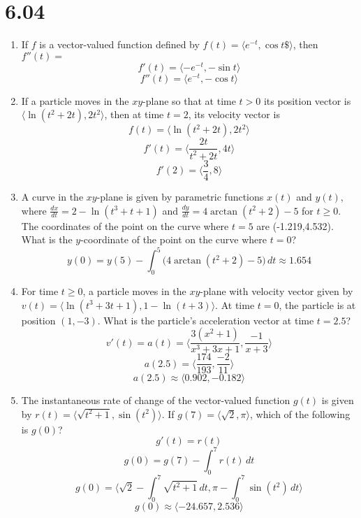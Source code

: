 \documentclass[12pt]{article}
\begin{document}
\section*{6.04}
    \begin{enumerate}
        \item If $f$ is a vector-valued function defined by $f(t)=\langle e^{-t},\cos t\$ \rangle$, then $f''(t)=$
        $$f'(t) = \langle -e^{-t}, -\sin t \rangle $$
        $$\boxed{f''(t) = \langle e^{-t}, -\cos t \rangle}$$

        \item If a particle moves in the $xy$-plane so that at time $t>0$ its position vector is $\langle\ln(t^2+2t), 2t^2 \rangle$, then at time $t=2$, its velocity vector is
        $$f(t)=\langle\ln(t^2+2t), 2t^2 \rangle$$
        $$f'(t) = \biggr\langle \frac{2t}{t^2+2t}, 4t \biggr\rangle$$
        $$\boxed{f'(2) = \bigg\langle \frac{3}{4}, 8 \bigg\rangle}$$
        
        \item A curve in the $xy$-plane is given by parametric functions $x(t)$ and $y(t)$, where $\frac{dx}{dt} = 2-\ln(t^3+t+1)$ and $\frac{dy}{dt} = 4\arctan (t^2+2)-5$ for $t\geq 0$. The coordinates of the point on the curve where $t=5$ are (-1.219,4.532). What is the $y$-coordinate of the point on the curve where $t=0$?
        $$y(0) = y(5) - \int_{0}^{5} \big(4\arctan (t^2+2)-5 \big) \, dt \approx \boxed{1.654}$$

        \item For time $t \geq 0$, a particle moves in the $xy$-plane with velocity vector given by $v(t)=\langle \ln(t^3+3t+1),1-\ln(t+3)\rangle$. At time $t=0$, the particle is at position $(1,-3)$. What is the particle's acceleration vector at time $t=2.5$?
        $$v'(t) = a(t) = \biggr\langle \frac{3(x^2+1)}{x^3+3x+1}, \frac{-1}{x+3}\biggr\rangle$$
        $$a(2.5) = \biggr\langle \frac{174}{193}, \frac{-2}{11} \biggr\rangle$$
        $$\boxed{a(2.5) \approx \langle 0.902,-0.182 \rangle}$$
        \item The instantaneous rate of change of the vector-valued function $g(t)$ is given by $r(t)=\bigg\langle\sqrt{t^2+1}, \sin (t^2) \bigg\rangle$. If $g(7)=\langle\sqrt{2},\pi\rangle$, which of the following is $g(0)$?
        $$g'(t) = r(t)$$
        $$g(0) = g(7) - \int_{0}^{7} r(t) \, dt$$
        $$g(0) = \biggr\langle \sqrt{2} - \int_{0}^{7} \sqrt{t^2+1} \, dt, \pi - \int_{0}^{7} \sin(t^2) \, dt \biggr\rangle$$
        $$\boxed{g(0) \approx \langle -24.657,2.536 \rangle}$$


\end{enumerate}
\end{document}
